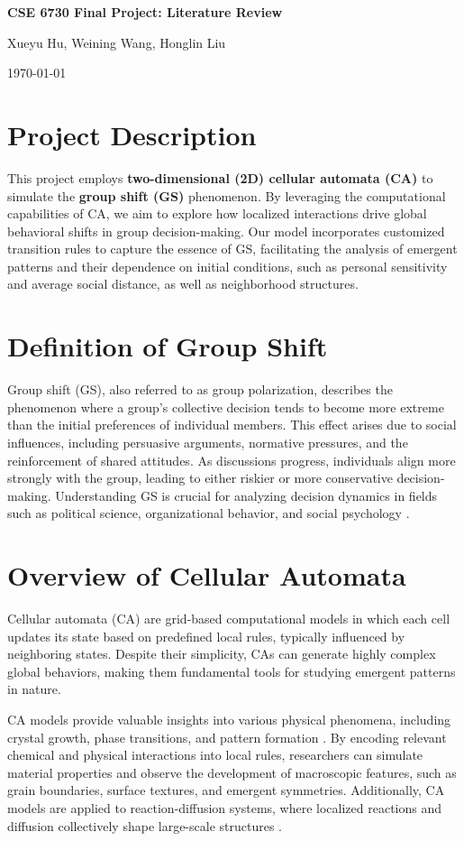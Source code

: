 \documentclass[11pt]{article}
\begin{document}
\centerline{\bf \Large CSE 6730 Final Project: Literature Review}
\medskip
\centerline{Xueyu Hu, Weining Wang, Honglin Liu}
\centerline{{\small \today}}

\section*{\small Project Description}
This project employs \textbf{two-dimensional (2D) cellular automata (CA)} to simulate the \textbf{group shift (GS)} phenomenon. By leveraging the computational capabilities of CA, we aim to explore how localized interactions drive global behavioral shifts in group decision-making. Our model incorporates customized transition rules to capture the essence of GS, facilitating the analysis of emergent patterns and their dependence on initial conditions, such as personal sensitivity and average social distance, as well as neighborhood structures.

\section*{\small Definition of Group Shift}
Group shift (GS), also referred to as group polarization, describes the phenomenon where a group’s collective decision tends to become more extreme than the initial preferences of individual members. This effect arises due to social influences, including persuasive arguments, normative pressures, and the reinforcement of shared attitudes. As discussions progress, individuals align more strongly with the group, leading to either riskier or more conservative decision-making. Understanding GS is crucial for analyzing decision dynamics in fields such as political science, organizational behavior, and social psychology \cite{beaur_Decidability_2020, beaur_Effective_2023}.

\section*{\small Overview of Cellular Automata}
Cellular automata (CA) are grid-based computational models in which each cell updates its state based on predefined local rules, typically influenced by neighboring states. Despite their simplicity, CAs can generate highly complex global behaviors, making them fundamental tools for studying emergent patterns in nature.

CA models provide valuable insights into various physical phenomena, including crystal growth, phase transitions, and pattern formation \cite{im_Investigating_2024, lebreton_Molecular_2018}. By encoding relevant chemical and physical interactions into local rules, researchers can simulate material properties and observe the development of macroscopic features, such as grain boundaries, surface textures, and emergent symmetries. Additionally, CA models are applied to reaction-diffusion systems, where localized reactions and diffusion collectively shape large-scale structures \cite{manukyan_Living_2017}.
\end{document}
